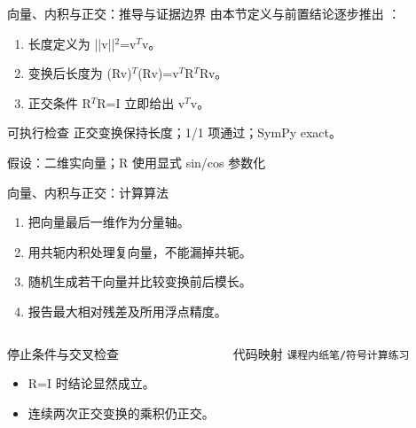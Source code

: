 \begin{frame}[t]{向量、内积与正交：推导与证据边界}
\footnotesize
{}\quad 由本节定义与前置结论逐步推出 ：
\begin{enumerate}
\item 长度定义为 ||v||\ensuremath{^{2}}=v\ensuremath{^{T}}v。
\item 变换后长度为 (Rv)\ensuremath{^{T}}(Rv)=v\ensuremath{^{T}}R\ensuremath{^{T}}Rv。
\item 正交条件 R\ensuremath{^{T}}R=I 立即给出 v\ensuremath{^{T}}v。
\end{enumerate}\begin{block}{可执行检查}
\quad 正交变换保持长度；1/1 项通过；SymPy exact。
\par\scriptsize 假设：二维实向量；R 使用显式 sin/\allowbreak{}cos 参数化
\end{block}
\end{frame}

\begin{frame}[t]{向量、内积与正交：计算算法}
\footnotesize
{}\begin{enumerate}
\item 把向量最后一维作为分量轴。
\item 用共轭内积处理复向量，不能漏掉共轭。
\item 随机生成若干向量并比较变换前后模长。
\item 报告最大相对残差及所用浮点精度。
\end{enumerate}\begin{columns}[T,onlytextwidth]
\begin{block}{停止条件与交叉检查}\scriptsize\begin{itemize}
\item[\CheckMark] R=I 时结论显然成立。
\item[\CheckMark] 连续两次正交变换的乘积仍正交。
\end{itemize}\end{block}
\begin{block}{代码映射}
\scriptsize \texttt{课程内纸笔/\allowbreak{}符号计算练习}
\end{block}\end{columns}\end{frame}

